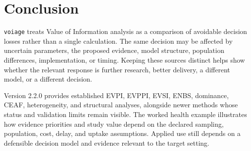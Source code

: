 \section{Conclusion}

\texttt{voiage} treats Value of Information analysis as a comparison of
avoidable decision losses rather than a single calculation. The same decision
may be affected by uncertain parameters, the proposed evidence, model
structure, population differences, implementation, or timing. Keeping these
sources distinct helps show whether the relevant response is further research,
better delivery, a different model, or a different decision.

Version 2.2.0 provides established EVPI, EVPPI, EVSI, ENBS, dominance, CEAF,
heterogeneity, and structural analyses, alongside newer methods whose status
and validation limits remain visible. The worked health example illustrates
how evidence priorities and study value depend on the declared sampling,
population, cost, delay, and uptake assumptions. Applied use still depends on
a defensible decision model and evidence relevant to the target setting.
